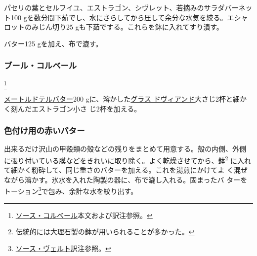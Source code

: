 \begin{recette}
パセリの葉とセルフイユ、エストラゴン、シヴレット、若摘みのサラダバーネッ
ト100 gを数分間下茹でし、水にさらしてから圧して余分な水気を絞る。エシャ
ロットのみじん切り25 gも下茹でする。これらを鉢に入れてすり潰す。

バター125 gを加え、布で漉す。

\maeaki

\hypertarget{beurre-colbert}{%
\subsubsection{ブール・コルベール}\label{beurre-colbert}}

\footnote{\protect\hyperlink{sauce-colbert}{ソース・コルベール}本文および訳注参照。}


\protect\hyperlink{beurre-maitre-d-hotel}{メートルドテルバター}200
gに、溶かした\protect\hyperlink{glace-de-viande}{グラス
ドヴィアンド}大さじ2杯と細かく刻んだエストラゴン小さ じ2杯を加える。

\maeaki

\hypertarget{beurre-colorant-rouge}{%
\subsubsection{色付け用の赤いバター}\label{beurre-colorant-rouge}}



出来るだけ沢山の甲殻類の殻などの残りをまとめて用意する。殻の内側、外側
に張り付いている膜などをきれいに取り除く。よく乾燥させてから、鉢\footnote{伝統的には大理石製の鉢が用いられることが多かった。}
に入れて細かく粉砕して、同じ重さのバターを加える。これを湯煎にかけてよ
く混ぜながら溶かす。氷水を入れた陶製の器に、布で漉し入れる。固まったバ
ターをトーション\footnote{\protect\hyperlink{sauce-verte}{ソース・ヴェルト}訳注参照。}で包み、余計な水を絞り出す。


\end{recette}
